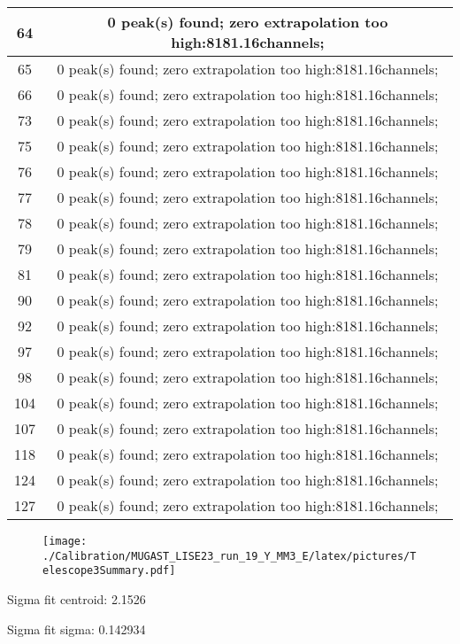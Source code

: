 \documentclass[a4paper,6pt]{article}
\begin{document}
\begin{center}
\begin{tabular}{ | c | c | }
64 &  0 peak(s) found; zero extrapolation too high:8181.16channels;  \\ \hline 
65 &  0 peak(s) found; zero extrapolation too high:8181.16channels;  \\ \hline 
66 &  0 peak(s) found; zero extrapolation too high:8181.16channels;  \\ \hline 
73 &  0 peak(s) found; zero extrapolation too high:8181.16channels;  \\ \hline 
75 &  0 peak(s) found; zero extrapolation too high:8181.16channels;  \\ \hline 
76 &  0 peak(s) found; zero extrapolation too high:8181.16channels;  \\ \hline 
77 &  0 peak(s) found; zero extrapolation too high:8181.16channels;  \\ \hline 
78 &  0 peak(s) found; zero extrapolation too high:8181.16channels;  \\ \hline 
79 &  0 peak(s) found; zero extrapolation too high:8181.16channels;  \\ \hline 
81 &  0 peak(s) found; zero extrapolation too high:8181.16channels;  \\ \hline 
90 &  0 peak(s) found; zero extrapolation too high:8181.16channels;  \\ \hline 
92 &  0 peak(s) found; zero extrapolation too high:8181.16channels;  \\ \hline 
97 &  0 peak(s) found; zero extrapolation too high:8181.16channels;  \\ \hline 
98 &  0 peak(s) found; zero extrapolation too high:8181.16channels;  \\ \hline 
104 &  0 peak(s) found; zero extrapolation too high:8181.16channels;  \\ \hline 
107 &  0 peak(s) found; zero extrapolation too high:8181.16channels;  \\ \hline 
118 &  0 peak(s) found; zero extrapolation too high:8181.16channels;  \\ \hline 
124 &  0 peak(s) found; zero extrapolation too high:8181.16channels;  \\ \hline 
127 &  0 peak(s) found; zero extrapolation too high:8181.16channels;  \\ \hline 
\end{tabular} 
\end{center}
\begin{figure}[htcb!]
\begin{center}
\texttt{[image: ./Calibration/MUGAST\_LISE23\_run\_19\_Y\_MM3\_E/latex/pictures/Telescope3Summary.pdf]}
\end{center}
\end{figure}
\pagebreak
Sigma fit centroid: 2.1526

Sigma fit sigma: 0.142934
\end{document}
